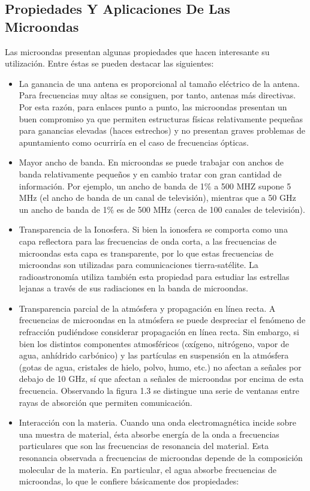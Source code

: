 \documentclass[12pt]{article}
\begin{document}
\subsection{Propiedades Y Aplicaciones De Las Microondas}
Las microondas presentan algunas propiedades que hacen interesante su utilizaci\'on. Entre \'estas se pueden destacar las siguientes:
\begin{itemize}
	\item La ganancia de una antena es proporcional al tama\~no el\'ectrico de la antena. Para frecuencias muy altas se consiguen, por tanto, antenas m\'as directivas. Por esta raz\'on, para enlaces punto a punto, las microondas presentan un buen compromiso ya que permiten estructuras f\'isicas relativamente peque\~nas para ganancias elevadas (haces estrechos) y no presentan graves problemas de apuntamiento como ocurrir\'ia en el caso de frecuencias \'opticas.
	\item Mayor ancho de banda. En microondas se puede trabajar con anchos de banda relativamente peque\~nos y en cambio tratar con gran cantidad de informaci\'on. Por ejemplo, un ancho de banda de 1\% a 500 MHZ supone 5 MHz (el ancho de banda de un canal de televisi\'on), mientras que a 50 GHz un ancho de banda de 1\% es de 500 MHz (cerca de 100 canales de televisi\'on).
	\item Transparencia de la Ionosfera. Si bien la ionosfera se comporta como una capa reflectora para las frecuencias de onda corta, a las frecuencias de microondas esta capa es transparente, por lo que estas frecuencias de microondas son utilizadas para comunicaciones tierra-sat\'elite. La radioastronom\'ia utiliza tambi\'en esta propiedad para estudiar las estrellas lejanas a trav\'es de sus radiaciones en la banda de microondas.
	\item Transparencia parcial de la atm\'osfera y propagaci\'on en l\'inea recta. A frecuencias de microondas en la atm\'osfera se puede despreciar el fen\'omeno de refracci\'on pudi\'endose considerar propagaci\'on en l\'inea recta. Sin embargo, si bien los distintos componentes atmosf\'ericos (ox\'igeno, nitr\'ogeno, vapor de agua, anh\'idrido carb\'onico) y las part\'iculas en suspensi\'on en la atm\'osfera (gotas de agua, cristales de hielo, polvo, humo, etc.) no afectan a se\~nales por debajo de 10 GHz, s\'i que afectan a se\~nales de microondas por encima de esta frecuencia. Observando la figura 1.3 se distingue una serie de ventanas entre rayas de absorci\'on que permiten comunicaci\'on.
	\item Interacci\'on con la materia. Cuando una onda electromagn\'etica incide sobre una muestra de material, \'esta absorbe energ\'ia de la onda a frecuencias particulares que son las frecuencias de resonancia del material. Esta resonancia observada a frecuencias de microondas depende de la composici\'on molecular de la materia. En particular, el agua absorbe frecuencias de microondas, lo que le confiere b\'asicamente dos propiedades:

\end{itemize}
\end{document}
